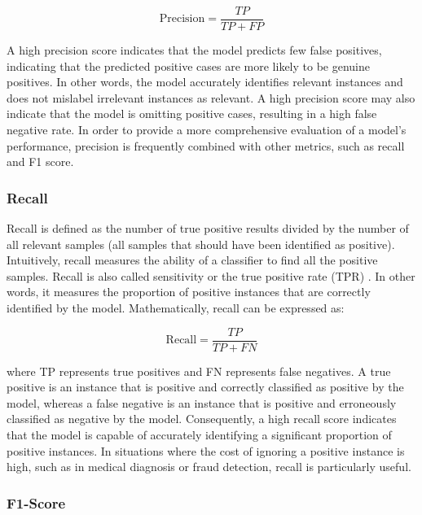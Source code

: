 \documentclass{article}[12pt]
\theoremstyle{definition}
\begin{document}
$$ \text{Precision} = \frac{TP}{TP + FP}$$

\medskip

\noindent
A high precision score indicates that the model predicts few false positives, indicating that the predicted positive cases are more likely to be genuine positives. In other words, the model accurately identifies relevant instances and does not mislabel irrelevant instances as relevant. A high precision score may also indicate that the model is omitting positive cases, resulting in a high false negative rate. In order to provide a more comprehensive evaluation of a model's performance, precision is frequently combined with other metrics, such as recall and F1 score.

\newpage

\bigskip

\subsubsection{Recall}

\bigskip

Recall is defined as the number of true positive results divided by the number of all relevant samples (all samples that should have been identified as positive). Intuitively, recall measures the ability of a classifier to find all the positive samples. Recall is also called sensitivity or the true positive rate (TPR) \cite{davis2006evaluation2}. In other words, it measures the proportion of positive instances that are correctly identified by the model. Mathematically, recall can be expressed as:

\medskip

$$ \text{Recall} = \frac{TP}{TP + FN}$$

\medskip

\noindent
where TP represents true positives and FN represents false negatives. A true positive is an instance that is positive and correctly classified as positive by the model, whereas a false negative is an instance that is positive and erroneously classified as negative by the model. Consequently, a high recall score indicates that the model is capable of accurately identifying a significant proportion of positive instances. In situations where the cost of ignoring a positive instance is high, such as in medical diagnosis or fraud detection, recall is particularly useful.

\bigskip

\subsubsection{F1-Score}
\end{document}
